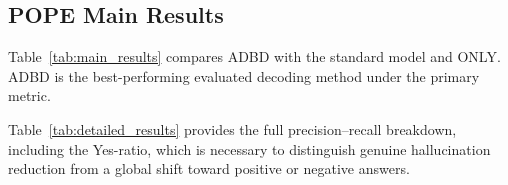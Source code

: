 \subsection{POPE Main Results}

Table~\ref{tab:main_results} compares ADBD with the standard model and ONLY. ADBD is the best-performing evaluated decoding method under the primary metric.

\begin{table}[t]
\centering
\small
\setlength{\tabcolsep}{4pt}
\caption{Main POPE results for LLaVA-1.5-7B. Macro values are computed across the three splits. \todo: insert values from the experiment spreadsheet.}
\label{tab:main_results}
\end{table}

Table~\ref{tab:detailed_results} provides the full precision--recall breakdown, including the Yes-ratio, which is necessary to distinguish genuine hallucination reduction from a global shift toward positive or negative answers.

